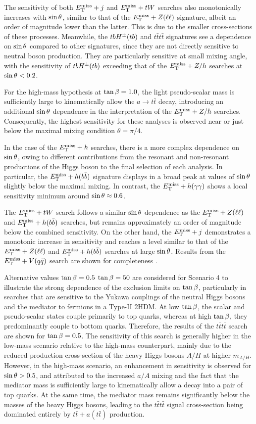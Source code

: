 The sensitivity of both $E_{\mathrm{T}}^{\mathrm{miss}}+j$ and $E_{\mathrm{T}}^{\mathrm{miss}}+tW$ searches also monotonically increases with $\sin\theta$, similar to that of the $E_{\mathrm{T}}^{\mathrm{miss}}+Z(\ell\ell)$ signature, albeit an order of magnitude lower than the latter. This is due to the smaller cross-sections of these processes. Meanwhile, the $tbH^{\pm}(tb)$ and $t\bar{t}t\bar{t}$ signatures see a dependence on $\sin\theta$ compared to other signatures, since they are not directly sensitive to neutral boson production. They are particularly sensitive at small mixing angle, with the sensitivity of $tbH^{\pm}(tb)$ exceeding that of the $E_{\mathrm{T}}^{\mathrm{miss}}+Z/h$ searches at $\sin\theta < 0.2$. 

For the high-mass hypothesis at $\tan\beta=1.0$, the light pseudo-scalar mass is sufficiently large to kinematically allow the $a\rightarrow t\bar{t}$ decay, introducing an additional $\sin\theta$ dependence in the interpretation of the $E_{\mathrm{T}}^{\mathrm{miss}}+Z/h$ searches. Consequently, the highest sensitivity for these analyses is observed near or just below the maximal mixing condition $\theta=\pi/4$. 

In the case of the $E_{\mathrm{T}}^{\mathrm{miss}} +h$ searches, there is a more complex dependence on $\sin\theta$, owing to different contributions from the resonant and non-resonant productions of the Higgs boson to the final selection of each analysis. In particular, the $E_{\mathrm{T}}^{\mathrm{miss}} +h(b\bar{b})$ signature displays in a broad peak at values of $\sin\theta$ slightly below the maximal mixing. In contrast, the $E_{\mathrm{T}}^{\mathrm{miss}} +h(\gamma\gamma)$ shows a local sensitivity minimum around $\sin\theta\approx 0.6$. 

The $E_{\mathrm{T}}^{\mathrm{miss}} + tW$ search follows a similar $\sin\theta$ dependence as the $E_{\mathrm{T}}^{\mathrm{miss}}+Z(\ell\ell)$ and $E_{\mathrm{T}}^{\mathrm{miss}}+h(b\bar{b})$ searches, but remains approximately an order of magnitude below the combined sensitivity. On the other hand, the $E_{\mathrm{T}}^{\mathrm{miss}}+j$ demonstrates a monotonic increase in sensitivity and reaches a level similar to that of the $E_{\mathrm{T}}^{\mathrm{miss}}+Z(\ell\ell)$ and $E_{\mathrm{T}}^{\mathrm{miss}}+h(b\bar{b})$ searches at large $\sin\theta$. Results from the $E_{\mathrm{T}}^{\mathrm{miss}}+V(q\bar{q})$ search are shown for completeness \cite{EXOT-2017-32}.

Alternative values $\tan\beta=0.5$ $\tan\beta=50$ are considered for Scenario 4 to illustrate the strong dependence of the exclusion limits on $\tan\beta$, particularly in searches that are sensitive to the Yukawa couplings of the neutral Higgs bosons and the mediator to fermions in a Type-II 2HDM. At low $\tan\beta$, the scalar and pseudo-scalar states couple primarily to top quarks, whereas at high $\tan\beta$, they predominantly couple to bottom quarks. Therefore, the results of the $t\bar{t}t\bar{t}$ search are shown for $\tan\beta=0.5$. The sensitivity of this search is generally higher in the low-mass scenario relative to the high-mass counterpart, mainly due to the reduced production cross-section of the heavy Higgs bosons $A/H$ at higher $m_{A/H}$. However, in the high-mass scenario, an enhancement in sensitivity is observed for $\sin\theta > 0.5$, and attributed to the increased $a/A$ mixing and the fact that the mediator mass is sufficiently large to kinematically allow a decay into a pair of top quarks. At the same time, the mediator mass remains significantly below the masses of the heavy Higgs bosons, leading to the $t\bar{t}t\bar{t}$ signal cross-section being dominated entirely by $t\bar{t} + a (t\bar{t})$ production. 


